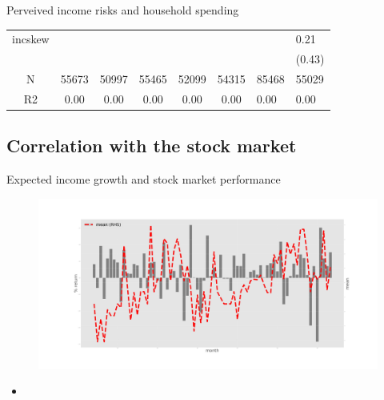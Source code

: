 \documentclass{beamer}
\begin{document}
\begin{frame}{Perveived income risks and household spending}
\begin{table}
{\begin{tabular}{ccccccll}
		incskew   &            &             &              &               &                &                 &             0.21 \\
		&            &             &              &               &                &                 &           (0.43) \\
		\hline 
		N         &      55673 &       50997 &        55465 &         52099 &          54315 &           85468 &            55029 \\
		R2        &       0.00 &        0.00 &         0.00 &          0.00 &           0.00 &            0.00 &             0.00 \\
		\hline 
	\end{tabular}
		}
	\end{table}
\end{frame}


\subsection{Correlation with the stock market}

\begin{frame}{Expected income growth and stock market performance}
		\begin{figure}
		\centering
		\label{ts_mean}
		\includegraphics[width=\textwidth]{figures/tsMedmean.jpg}
	\end{figure}
	\begin{itemize}
		\item 
	\end{itemize}
\end{frame}
\end{document}

